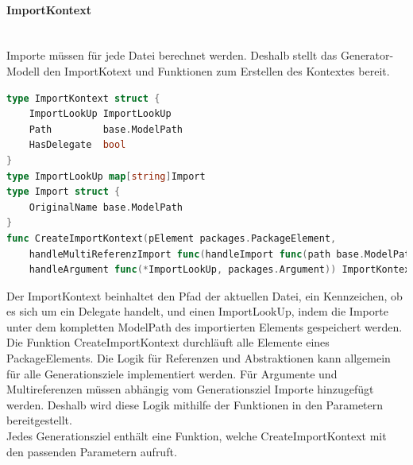 \documentclass[./einleitung.tex]{subfiles}
\begin{document}
    \paragraph{ImportKontext}\mbox{}\\
    Importe müssen für jede Datei berechnet werden.
    Deshalb stellt das Generator-Modell den ImportKotext und Funktionen zum Erstellen des Kontextes bereit.
    \begin{lstlisting}[language=Go, caption=ImportKontext, label=lst:importKontext]
type ImportKontext struct {
	ImportLookUp ImportLookUp
	Path         base.ModelPath
	HasDelegate  bool
}
type ImportLookUp map[string]Import
type Import struct {
	OriginalName base.ModelPath
}
func CreateImportKontext(pElement packages.PackageElement,
	handleMultiReferenzImport func(handleImport func(path base.ModelPath), typ packages.MultiReferenzType),
	handleArgument func(*ImportLookUp, packages.Argument)) ImportKontext {}
    \end{lstlisting}
    Der ImportKontext beinhaltet den Pfad der aktuellen Datei, ein Kennzeichen, ob es sich um ein Delegate handelt, und einen ImportLookUp, indem die Importe unter dem kompletten ModelPath des importierten Elements gespeichert werden.
    Die Funktion CreateImportKontext durchläuft alle Elemente eines PackageElements.
    Die Logik für Referenzen und Abstraktionen kann allgemein für alle Generationsziele implementiert werden.
    Für Argumente und Multireferenzen müssen abhängig vom Generationsziel Importe hinzugefügt werden.
    Deshalb wird diese Logik mithilfe der Funktionen in den Parametern bereitgestellt.\\
    Jedes Generationsziel enthält eine Funktion, welche CreateImportKontext mit den passenden Parametern aufruft.
\end{document}
